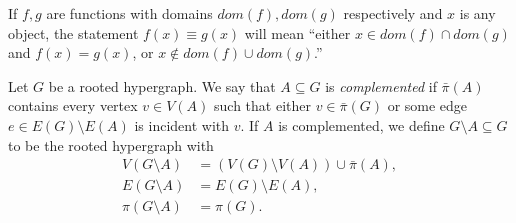 If $f, g$ are functions with domains $dom(f), dom(g)$ respectively and $x$ is any object, the statement $f(x) \equiv g(x)$ will mean ``either $x \in dom(f) \cap dom(g)$ and $f(x) = g(x)$, or $x \notin dom(f) \cup dom(g)$.''

Let $G$ be a rooted hypergraph. We say that $A \subseteq G$ is \textit{complemented} if $\bar{\pi}(A)$ contains every vertex $v \in V(A)$ such that either $v \in \bar{\pi}(G)$ or some edge $e \in E(G) \setminus E(A)$ is incident with $v$. If $A$ is complemented, we define $G \setminus A \subseteq G$ to be the rooted hypergraph with
\begin{align*}
V(G \setminus A) &= (V(G) \setminus V(A)) \cup \bar{\pi}(A), \\
E(G \setminus A) &= E(G) \setminus E(A), \\
\pi(G \setminus A) &= \pi(G).
\end{align*}
